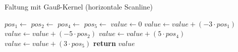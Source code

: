 \begin{algorithm}
	\caption{Faltung mit Gauß-Kernel (horizontale Scanline)}
	\label{src:analyseConvolution}
	\begin{algorithmic}[1]
		\State $pos_1 \gets$ 
		\State $pos_2 \gets$ 
		\State $pos_4 \gets$ 
		\State $pos_5 \gets$ 
		\State $value \gets 0$
		\State $value \gets value + \left( -3 \cdot pos_1 \right)$
		\State $value \gets value + \left( -5 \cdot pos_2 \right)$
		\State $value \gets value + \left( 5 \cdot pos_4 \right)$
		\State $value \gets value + \left( 3 \cdot pos_5 \right)$
		\State \textbf{return} $value$
		\EndProcedure
	\end{algorithmic}
\end{algorithm}
